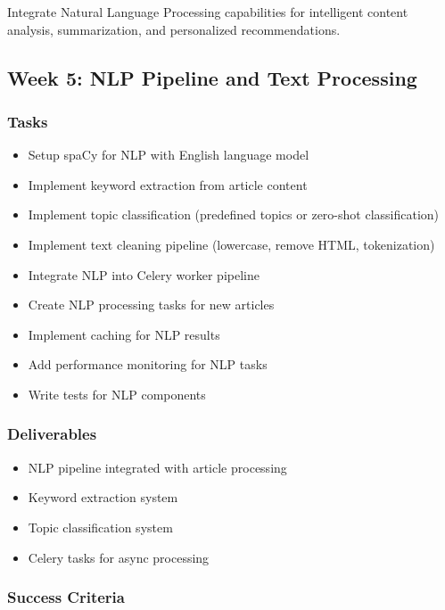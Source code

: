 \documentclass[12pt,oneside]{report}
\begin{document}
Integrate Natural Language Processing capabilities for intelligent content analysis, summarization, and personalized recommendations.

\subsection{Week 5: NLP Pipeline and Text Processing}

\subsubsection{Tasks}

\begin{itemize}
    \item Setup spaCy for NLP with English language model
    \item Implement keyword extraction from article content
    \item Implement topic classification (predefined topics or zero-shot classification)
    \item Implement text cleaning pipeline (lowercase, remove HTML, tokenization)
    \item Integrate NLP into Celery worker pipeline
    \item Create NLP processing tasks for new articles
    \item Implement caching for NLP results
    \item Add performance monitoring for NLP tasks
    \item Write tests for NLP components
\end{itemize}

\subsubsection{Deliverables}

\begin{itemize}
    \item NLP pipeline integrated with article processing
    \item Keyword extraction system
    \item Topic classification system
    \item Celery tasks for async processing
\end{itemize}

\subsubsection{Success Criteria}
\end{document}

